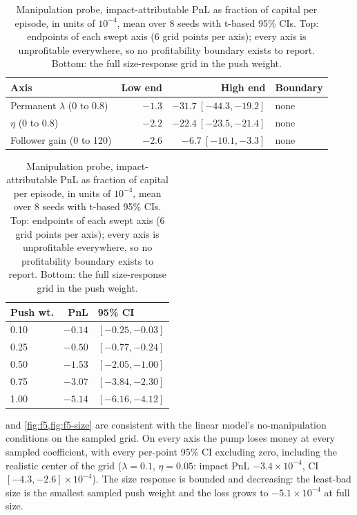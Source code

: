 \begin{table}[t]
\centering
\caption{Manipulation probe, impact-attributable PnL as fraction of capital per episode, in units of $10^{-4}$, mean over 8 seeds with t-based 95\% CIs. Top: endpoints of each swept axis (6 grid points per axis); every axis is unprofitable everywhere, so no profitability boundary exists to report. Bottom: the full size-response grid in the push weight.}
\label{tab:f5}
\small
\begin{tabular}{lrrl}
\toprule
Axis & Low end & High end & Boundary \\
\midrule
Permanent $\lambda$ (0 to 0.8) & $-1.3$ & $-31.7\ [-44.3, -19.2]$ & none \\
$\eta$ (0 to 0.8) & $-2.2$ & $-22.4\ [-23.5, -21.4]$ & none \\
Follower gain (0 to 120) & $-2.6$ & $-6.7\ [-10.1, -3.3]$ & none \\
\bottomrule
\end{tabular}

\medskip

\begin{tabular}{lrl}
\toprule
Push wt. & PnL & 95\% CI \\
\midrule
0.10 & $-0.14$ & $[-0.25, -0.03]$ \\
0.25 & $-0.50$ & $[-0.77, -0.24]$ \\
0.50 & $-1.53$ & $[-2.05, -1.00]$ \\
0.75 & $-3.07$ & $[-3.84, -2.30]$ \\
1.00 & $-5.14$ & $[-6.16, -4.12]$ \\
\bottomrule
\end{tabular}
\end{table}

 and \cref{fig:f5,fig:f5-size} are consistent with the linear model's no-manipulation conditions on the sampled grid. On every axis the pump loses money at every sampled coefficient, with every per-point 95\% CI excluding zero, including the realistic center of the grid ($\lambda = 0.1$, $\eta = 0.05$: impact PnL $-3.4 \times 10^{-4}$, CI $[-4.3, -2.6] \times 10^{-4}$). The size response is bounded and decreasing: the least-bad size is the smallest sampled push weight and the loss grows to $-5.1 \times 10^{-4}$ at full size.

